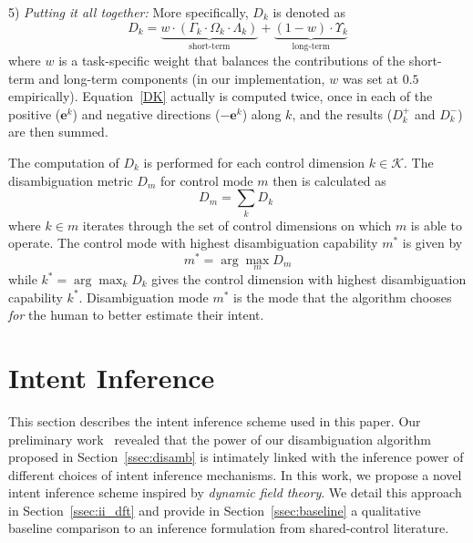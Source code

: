 \documentclass[natbib, twocolumn]{svjour3}          %
\newcommand{\argmax}{\arg\!\max}
\begin{document}
5) \textit{Putting it all together:} 
More specifically, $D_k$ is denoted as 
\begin{equation}\label{DK}
D_{k} = \underbrace{w\cdot(\Gamma_k\cdot \Omega_k\cdot\Lambda_k)}_{\text{short-term}} + \underbrace{(1 - w)\cdot \Upsilon_k}_{\text{long-term}}
\end{equation}
where $w$ is a task-specific weight that balances the contributions of the short-term and long-term components (in our implementation, $w$ was set at $0.5$ empirically). Equation~\ref{DK} actually is computed twice, once in each of the positive ($\boldsymbol{e}^k$) and negative directions ($-\boldsymbol{e}^k$) along $k$, and the results ($D_k^+$ and $D_k^-$) are then summed. 

The computation of $D_k$ is performed for each control dimension $k \in \mathcal{K}$. The disambiguation metric $D_m$ for control mode $m$ then is calculated as 
\begin{equation*}\label{EQ2}
D_m = \sum_{k} D_{k} \;
\end{equation*}
where $k \in m$ iterates through the set of control dimensions on which $m$ is able to operate.
The control mode with highest disambiguation capability $m^*$ is given by
\begin{equation*}
m^* = \argmax_m  D_{m}
\end{equation*}
while $k^* = \argmax_k D_k$ gives the control dimension with highest disambiguation capability $k^{*}$.
Disambiguation mode $m^{*}$ is the mode that the algorithm chooses \textit{for} the human to better estimate their intent. 

\section{Intent Inference}\label{sec:inference}
This section describes the intent inference scheme used in this paper. Our preliminary work~\citep{gopinath2017mode} revealed that the power of our disambiguation algorithm proposed in Section~\ref{ssec:disamb} is intimately linked with the inference power of different choices of intent inference mechanisms. In this work, we propose a novel intent inference scheme inspired by \textit{dynamic field theory}. We detail this approach in Section~\ref{ssec:ii_dft} and provide in Section~\ref{ssec:baseline} a qualitative baseline comparison to an inference formulation from shared-control literature. 
\end{document}
